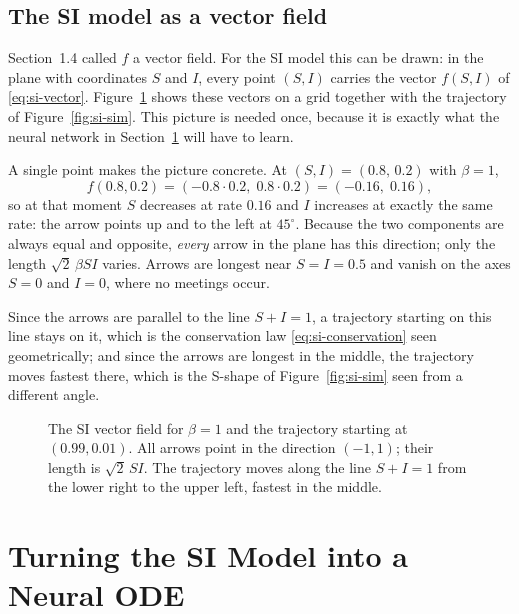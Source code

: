 \documentclass[11pt,a4paper]{article}
\newcommand{\figph}[2]{%
  \fbox{\parbox[c][3.2cm][c]{\dimexpr#1-2\fboxsep-2\fboxrule\relax}{%
    \centering\small\ttfamily [figure: #2]}}}
\begin{document}
\subsection{The SI model as a vector field}
\label{sec:si-field}

Section~1.4 called $f$ a vector field. For the SI model this can be drawn:
in the plane with coordinates $S$ and $I$, every point $(S,I)$ carries the
vector $f(S,I)$ of \eqref{eq:si-vector}. Figure~\ref{fig:si-field} shows
these vectors on a grid together with the trajectory of Figure~\ref{fig:si-sim}.
This picture is needed once, because it is exactly what the neural network in
Section~\ref{sec:si-node} will have to learn.

A single point makes the picture concrete. At $(S,I) = (0.8,\,0.2)$ with
$\beta=1$,
\[
  f(0.8,0.2) = (-0.8\cdot 0.2,\; 0.8\cdot 0.2) = (-0.16,\; 0.16),
\]
so at that moment $S$ decreases at rate $0.16$ and $I$ increases at exactly the
same rate: the arrow points up and to the left at $45^\circ$. Because the two
components are always equal and opposite, \emph{every} arrow in the plane has
this direction; only the length $\sqrt{2}\,\beta SI$ varies. Arrows are longest
near $S=I=0.5$ and vanish on the axes $S=0$ and $I=0$, where no meetings occur.

Since the arrows are parallel to the line $S+I=1$, a trajectory starting on
this line stays on it, which is the conservation law \eqref{eq:si-conservation}
seen geometrically; and since the arrows are longest in the middle, the
trajectory moves fastest there, which is the S-shape of Figure~\ref{fig:si-sim}
seen from a different angle.

\begin{figure}[h]
  \centering
  \figph{0.55\textwidth}{fig\_si\_phase\_plane}
  \caption{The SI vector field for $\beta=1$ and the trajectory starting at
  $(0.99,0.01)$. All arrows point in the direction $(-1,1)$; their length is
  $\sqrt{2}\,SI$. The trajectory moves along the line $S+I=1$ from the lower right
  to the upper left, fastest in the middle.}
  \label{fig:si-field}
\end{figure}

\section{Turning the SI Model into a Neural ODE}
\label{sec:si-node}
\end{document}
